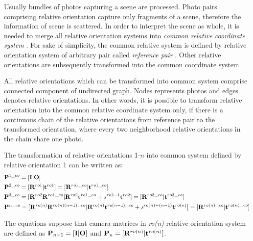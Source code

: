 \documentclass[a4paper,12pt]{article}
\newcommand{\ematr}[1]{%
{\bf #1}%
}
\newcommand{\evect}[1]{%
{\bf #1}%
}
\newcommand{\escal}[1]{%
{\it #1}%
}
\newcommand{\term}[1]{%
{\it #1}%
}
\begin{document}


Usually bundles of photos capturing a scene are processed. Photo pairs comprising relative orientation capture only fragments of a scene, 
therefore the information of scene is scattered.  
In order to interpret the scene as whole, it is needed to merge all relative orientation systems into \term{common relative coordinate system}.
For sake of simplicity, the common relative system is defined by relative orientation system of arbitrary pair called \term{reference pair}.
Other relative orientations are subsequently transformed into the common coordinate system. 


All relative orientations which can be transformed into common system comprise
 connected component of undirected graph.  Nodes represents  photos and edges denotes relative orientations. 
In other words, it is possible to transform relative orientation into the common relative coordinate system only, if there 
is a continuous chain of the relative orientations from reference pair 
to the transformed orientation, where every two neighborhood relative orientations in the chain share one photo.

The transformation of relative orientations 1-$n$ into common system defined by relative orientation 1 can be written as: 
\begin{equation}
\label{eq:comm_rel}
\begin{split}
&\ematr{P}^{1\_co} = [\ematr{I}|\evect{O}] \\
&\ematr{P}^{2\_co} = [\ematr{R}^{ro1}|\evect{t}^{ro1}] = [\ematr{R}^{ro1\_co}|\evect{t}^{ro1\_co}] \\
&\ematr{P}^{3\_co} = [\ematr{R}^{ro2} \ematr{R}^{ro1\_co}|\ematr{R}^{ro2} \evect{t}^{ro1\_co} + \escal{s}^{ro2-1} \evect{t}^{ro2}] 
=  [\ematr{R}^{ro3\_co} | \evect{t}^{ro3\_co}] \\
&\ematr{P}^{n\_co} = [\ematr{R}^{ro(n)} \ematr{R}^{ro(n)(n-1)\_co}|\ematr{R}^{ro(n)} \evect{t}^{ro(n-1)\_co} + \escal{s}^{ro(n)-(n-1)} \evect{t}^{ro(n)}] 
=  [\ematr{R}^{ro(n)\_co} | \evect{t}^{ro(n)\_co}] 
\end{split}
\end{equation}

The equations suppose that camera matrices in \escal{ro(n)} relative orientation system
are defined as $\ematr{P}_{n-1} = [\ematr{I}|\evect{O}]$ and $\ematr{P}_{n} = [\ematr{R}^{ro(n)}|\evect{t}^{ro(n)}]$.
\end{document}
